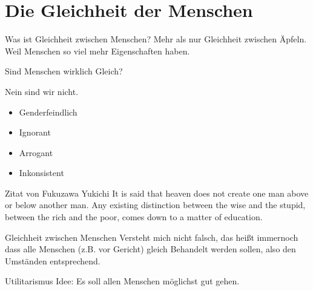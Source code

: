 \section{Die Gleichheit der Menschen}


\begin{frame}[c]{Was ist Gleichheit zwischen Menschen?}
    \Large
    Mehr als nur Gleichheit zwischen Äpfeln. \\ \pause
    Weil Menschen so viel mehr Eigenschaften haben.
\end{frame}


\begin{frame}[c]{Sind Menschen wirklich Gleich?}
    \Large

    Nein sind wir nicht.

    \begin{itemize}
            \pause
        \item Genderfeindlich
            \pause
        \item Ignorant
            \pause
        \item Arrogant
            \pause
        \item Inkonsistent
    \end{itemize}

\end{frame}


\begin{frame}[c]{Zitat von Fukuzawa Yukichi}
    \Large
    It is said that heaven does not create one man above or below another man.
    Any existing distinction between the wise and the stupid, between the rich
    and the poor, comes down to a matter of education.
\end{frame}


\begin{frame}[c]{Gleichheit zwischen Menschen}
    \Large
    Versteht mich nicht falsch, das heißt immernoch dass alle Menschen (z.B. vor
    Gericht) gleich Behandelt werden sollen, also den Umständen entsprechend.
\end{frame}


\begin{frame}[c]{Utilitarismus}
    \Large
    Idee: Es soll allen Menschen möglichst gut gehen.
\end{frame}








